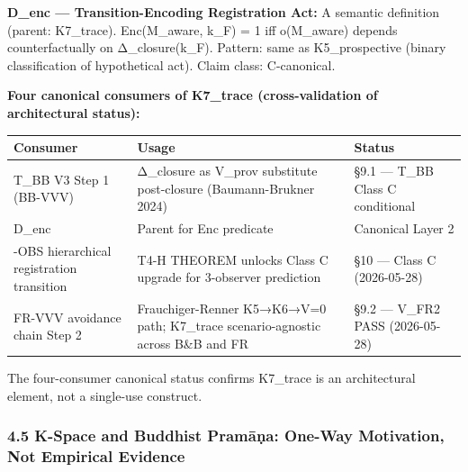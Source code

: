 \documentclass[
  11pt,
]{article}
\newcounter{none} %
\begin{document}
\textbf{D\_enc --- Transition-Encoding Registration Act:} A semantic
definition (parent: K7\_trace). Enc(M\_aware, k\_F) = 1 iff o(M\_aware)
depends counterfactually on Δ\_closure(k\_F). Pattern: same as
K5\_prospective (binary classification of hypothetical act). Claim
class: C-canonical.

\textbf{Four canonical consumers of K7\_trace (cross-validation of
architectural status):}

{\def\LTcaptype{none} %
\begin{longtable}[]{@{}
  >{\raggedright\arraybackslash}p{}
  >{\raggedright\arraybackslash}p{}
  >{\raggedright\arraybackslash}p{}@{}}
\toprule\noalign{}
\begin{minipage}[b]{\linewidth}\raggedright
Consumer
\end{minipage} & \begin{minipage}[b]{\linewidth}\raggedright
Usage
\end{minipage} & \begin{minipage}[b]{\linewidth}\raggedright
Status
\end{minipage} \\
\midrule\noalign{}
\endhead
\bottomrule\noalign{}
\endlastfoot
T\_BB V3 Step 1 (BB-VVV) & Δ\_closure as V\_prov substitute post-closure
(Baumann-Brukner 2024) & §9.1 --- T\_BB Class C conditional \\
D\_enc & Parent for Enc predicate & Canonical Layer 2 \\
3-OBS hierarchical registration transition & T4-H THEOREM unlocks Class
C upgrade for 3-observer prediction & §10 --- Class C (2026-05-28) \\
FR-VVV avoidance chain Step 2 & Frauchiger-Renner K5→K6→V=0 path;
K7\_trace scenario-agnostic across B\&B and FR & §9.2 --- V\_FR2 PASS
(2026-05-28) \\
\end{longtable}
}

The four-consumer canonical status confirms K7\_trace is an
architectural element, not a single-use construct.

\subsubsection{4.5 K-Space and Buddhist Pramāṇa: One-Way Motivation, Not
Empirical
Evidence}\label{k-space-and-buddhist-pramux101ux1e47a-one-way-motivation-not-empirical-evidence}
\end{document}
